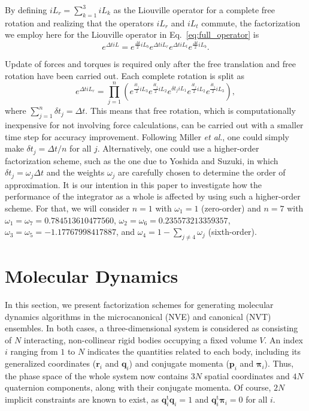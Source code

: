 \documentclass[aip,jcp,reprint,amsmath,amssymb]{revtex4-1}
\newcommand{\vt}[1]{\boldsymbol{\mathbf{#1}}}           %
\newcommand{\tr}[1]{#1^\text{t}}                               %
\begin{document}
By defining $i\!L_r = \sum_{k=1}^3 i\!L_k$ as the Liouville operator for a complete free rotation and realizing that the operators $i\!L_r$ and $i\!L_t$ commute, the factorization we employ here for the Liouville operator in Eq.~\ref{eq:full_operator} is
\begin{equation}
\label{eq:trotter_splitting_NVE}
e^{\Delta t i\!L} = e^{\frac{\Delta t}{2} i\!L_b} e^{\Delta t i\!L_r} e^{\Delta t i\!L_t} e^{\frac{\Delta t}{2} i\!L_b}.
\end{equation}

Update of forces and torques is required only after the free translation and free rotation have been carried out. Each complete rotation is split as\cite{Miller2002}
\begin{equation}
\label{eq:splitting_rot}
e^{\Delta t i\!L_r} = \prod_{j=1}^n \left( e^{\frac{\delta t_j}{2} i\!L_3} e^{\frac{\delta t_j}{2} i\!L_2} e^{\delta t_j i\!L_1} e^{\frac{\delta t_j}{2} i\!L_2} e^{\frac{\delta t_j}{2} i\!L_3} \right),
\end{equation}
where $\sum_{j=1}^n {\delta t}_j = \Delta t$. This means that free rotation, which is computationally inexpensive for not involving force calculations, can be carried out with a smaller time step for accuracy improvement. Following Miller \textit{et al}.,\cite{Miller2002} one could simply make $\delta t_j = \Delta t/n$ for all $j$. Alternatively, one could use a higher-order factorization scheme, such as the one due to Yoshida\cite{Yoshida1990} and Suzuki,\cite{Suzuki1991a, Suzuki1991b} in which $\delta t_j = \omega_j \Delta t$ and the weights $\omega_j$ are carefully chosen to determine the order of approximation. It is our intention in this paper to investigate how the performance of the integrator as a whole is affected by using such a higher-order scheme. For that, we will consider $n = 1$ with $\omega_1 = 1$ (zero-order) and $n = 7$ with $\omega_1 = \omega_7 = 0.784513610477560$, $\omega_2 = \omega_6 = 0.235573213359357$, $\omega_3 = \omega_5 = -1.17767998417887$, and $\omega_4 = 1 - \sum_{j \neq 4} \omega_j$ (sixth-order).

\section{Molecular Dynamics}
\label{sec:molecular_dynamics}

In this section, we present factorization schemes for generating molecular dynamics algorithms in the microcanonical (NVE) and canonical (NVT) ensembles. In both cases, a three-dimensional system is considered as consisting of $N$ interacting, non-collinear rigid bodies occupying a fixed volume $V$. An index $i$ ranging from $1$ to $N$ indicates the quantities related to each body, including its generalized coordinates ($\vt r_i$ and $\vt q_i$) and conjugate momenta ($\vt p_i$ and $\vt \pi_i$). Thus, the phase space of the whole system now contains $3N$ spatial coordinates and $4N$ quaternion components, along with their conjugate momenta. Of course, $2N$ implicit constraints are known to exist, as $\tr{\vt q}_i{\vt q}_i = 1$ and $\tr{\vt q}_i{\vt \pi}_i = 0$ for all $i$.
\end{document}
